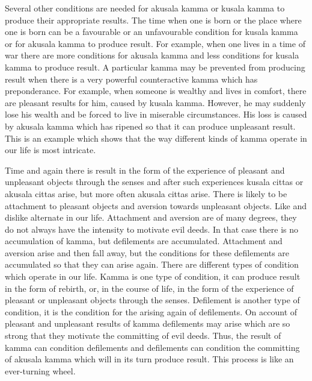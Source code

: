 \documentclass{book}
\begin{document}
Several other conditions are needed for akusala kamma or kusala kamma to
produce their appropriate results. The time when one is born or the
place where one is born can be a favourable or an unfavourable condition
for kusala kamma or for akusala kamma to produce result. For example,
when one lives in a time of war there are more conditions for akusala
kamma and less conditions for kusala kamma to produce result. A
particular kamma may be prevented from producing result when there is a
very powerful counteractive kamma which has preponderance. For example,
when someone is wealthy and lives in comfort, there are pleasant results
for him, caused by kusala kamma. However, he may suddenly lose his
wealth and be forced to live in miserable circumstances. His loss is
caused by akusala kamma which has ripened so that it can produce
unpleasant result. This is an example which shows that the way different
kinds of kamma operate in our life is most intricate.

Time and again there is result in the form of the experience of pleasant
and unpleasant objects through the senses and after such experiences 
kusala cittas or akusala cittas arise, but more often akusala cittas  arise. There is likely to be attachment to pleasant objects and
aversion towards unpleasant objects. Like and dislike alternate in our
life. Attachment and aversion are of many degrees, they do not always
have the intensity to motivate evil deeds. In that case there is no
accumulation of kamma, but defilements are accumulated. Attachment       and aversion arise and then fall away, but the conditions for these defilements are accumulated so that they can arise again. There
are different types of condition which operate in our life. Kamma is one
type of condition, it can produce result in the form of rebirth, or, in
the course of life, in the form of the experience of pleasant or
unpleasant objects through the senses. Defilement is another type of
condition, it is the condition for the arising again of defilements. On
account of pleasant and unpleasant results of kamma defilements may
arise which are so strong that they motivate the committing of evil
deeds. Thus, the result of kamma can condition defilements and
defilements can condition the committing of akusala kamma which will in
its turn produce result. This process is like an ever-turning wheel.
\end{document}
